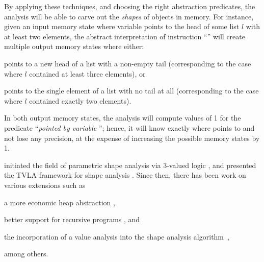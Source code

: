 By applying these techniques, and choosing the right abstraction
predicates, the analysis will be able to carve out the \emph{shapes}
of objects in memory. For instance, given an input memory state where
variable  points to the head of some list \(l\) with at least
two elements, the abstract interpretation of instruction ``'' will create multiple output memory states where either:
\begin{inparaenum}[(i)]
\item {} points to a new head of a list with a non-empty tail
  (corresponding to the case where \(l\) contained at least three
  elements), or
\item {} points to the single element of a list with no tail at
  all (corresponding to the case where \(l\) contained exactly two
  elements).
\end{inparaenum}
In both output memory states, the analysis will compute values of 1
for the predicate ``\emph{pointed by variable }''; hence, it
will know exactly where  points to and not lose any precision,
at the expense of increasing the possible memory states by 1.

\citeauthor{popl/SagivRW99} initiated the field of parametric shape
analysis via 3-valued logic
\cite{toplas/SagivRW98,popl/SagivRW99,toplas/SagivRW02}, and
\citeauthor{sas/Lev-AmiS00} presented the TVLA framework for shape
analysis \cite{sas/Lev-AmiS00}. Since then, there has been work on
various extensions such as
\begin{inparablank}
\item a more economic heap abstraction \cite{sas/ManevichSRF04},
\item better support for recursive programs \cite{cc/RinetzkyS01}, and
\item the incorporation of a value analysis into the shape analysis
  algorithm~\cite{sefm/FerraraFJ12},
\end{inparablank}
among others.

